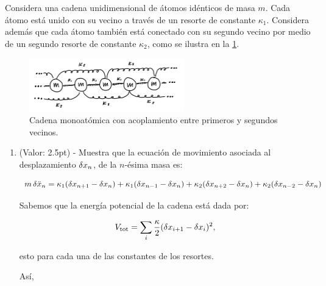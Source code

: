 \documentclass[./../main.tex]{subfiles}
\begin{document}
    \begin{exercise}
        Considera una cadena unidimensional de átomos idénticos de masa \(m\). Cada átomo está unido con su vecino a través de un resorte de constante \(\kappa_{1}\). Considera además que cada átomo también está conectado con su segundo vecino por medio de un segundo resorte de constante \(\kappa_{2}\), como se ilustra en la \cref{fig:monoatomicChain}.

        \begin{figure}[htb]
            \centering
            \includegraphics[width=0.6\textwidth]{monatomic-chain}
            \caption{Cadena monoatómica con acoplamiento entre primeros y segundos vecinos.}
            \label{fig:monoatomicChain}
        \end{figure}

        \begin{enumerate}
            \item (Valor: 2.5pt) - Muestra que la ecuación de movimiento asociada al desplazamiento \(\fdif{x_{n}}\), de la \(n\)-ésima masa es:
            
            \begin{equation*}
                m\fdif{\ddot{x}_{n}} = \kappa_{1}(\fdif{x_{n + 1}} - \fdif{x_{n}}) + \kappa_{1}(\fdif{x_{n - 1}} - \fdif{x_{n}}) + \kappa_{2}(\fdif{x_{n + 2}} - \fdif{x_{n}}) + \kappa_{2}(\fdif{x_{n - 2}} - \fdif{x_{n}})
            \end{equation*}

            \begin{solution}
                Sabemos que la energía potencial de la cadena está dada por:

                \begin{equation*}
                    V_{\text{tot}} = \sum_{i}\dfrac{\kappa}{2}(\fdif{x_{i + 1}} - \fdif{x_{i}})^{2},
                \end{equation*}

                esto para cada una de las constantes de los resortes.

                Así,


\end{solution}
\end{enumerate}
\end{exercise}
\end{document}
